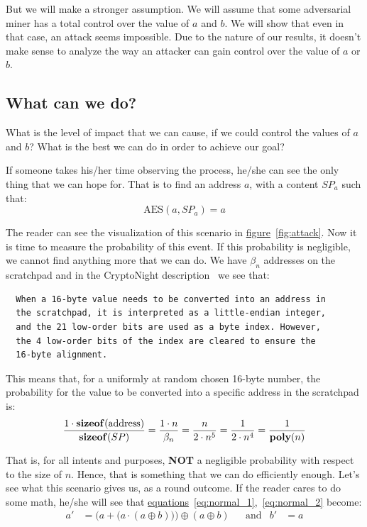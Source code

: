 But we will make a stronger assumption. We will assume that some adversarial miner has a total control over the value of $a$ and $b$. We will show that even in that case, an attack seems impossible. Due to the nature of our results, it doesn't make sense to analyze the way an attacker can gain control over the value of $a$ or $b$.

\subsection{What can we do?}
What is the level of impact that we can cause, if we could control the values of $a$ and $b$? What is the best we can do in order to achieve our goal?

If someone takes his/her time observing the process, he/she can see the only thing that we can hope for. That is to find an address $a$, with a content $SP_a$ such that:
\begin{equation} \nonumber
  \mbox{AES}(a,SP_a) = a
\end{equation}

The reader can see the visualization of this scenario in \hyperref[fig:attack]{figure}~\ref{fig:attack}. Now it is time to measure the probability of this event. If this probability is negligible, we cannot find anything more that we can do. We have $\beta_n$ addresses on the scratchpad and in the CryptoNight description~\cite{cryptonight} we see that:
\begin{verbatim}
  When a 16-byte value needs to be converted into an address in
  the scratchpad, it is interpreted as a little-endian integer,
  and the 21 low-order bits are used as a byte index. However,
  the 4 low-order bits of the index are cleared to ensure the
  16-byte alignment.
\end{verbatim}

This means that, for a uniformly at random chosen 16-byte number, the probability for the value to be converted into a specific address in the scratchpad is:
\begin{equation} \nonumber
  \frac{1 \cdot \mbox{\textbf{sizeof}}(\mbox{address})}{\mbox{\textbf{sizeof}}(SP)} =
  \frac{1 \cdot n}{\beta_n} = \frac{n}{2 \cdot n^5} = \frac{1}{2 \cdot n^4} = \frac{1}{\mbox{\textbf{poly}}(n)}
\end{equation}

That is, for all intents and purposes, \textbf{NOT} a negligible probability with respect to the size of $n$. Hence, that is something that we can do efficiently enough. Let's see what this scenario gives us, as a round outcome. If the reader cares to do some math, he/she will see that \hyperref[eq:normal_1]{equations}~\ref{eq:normal_1},~\ref{eq:normal_2} become:
\begin{align} \nonumber
  a' &= \Big( a + \big( a \cdot (a \oplus b) \big) \Big) \oplus (a \oplus b) &
  &\mbox{and} & b' &= a
\end{align}

